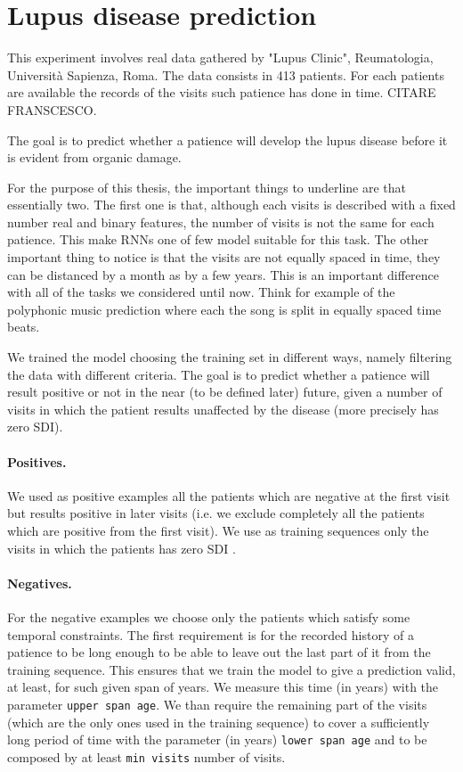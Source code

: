\section{Lupus disease prediction}

This experiment involves real data gathered by "Lupus Clinic", Reumatologia, Università Sapienza, Roma. The data consists in 413 patients. For each patients are available the records of the visits such patience has done in time. CITARE FRANSCESCO.

The goal is to predict whether a patience will develop the lupus disease before it is evident from organic damage.

For the purpose of this thesis, the important things to underline are that essentially two. The first one is that,  although each visits is described with a fixed number real and binary features, the number of visits  is not the same for each patience. This make RNNs one of few model suitable for this task. The other important thing to notice is that the visits are not equally spaced in time, they can be distanced by a month as by a few years. This is an important difference with all of the tasks we considered until now. Think for example of the polyphonic music prediction where each the song is split in equally spaced time beats.

 


We trained the model choosing the training set in different ways, namely filtering the data with different criteria. The goal is to predict whether a patience will result positive or not in the near (to be defined later) future, given a number of visits in which the patient results unaffected by the disease (more precisely has zero SDI).

\paragraph{Positives.} We used as positive examples all the patients which are negative at the first visit but results positive in later visits (i.e. we exclude completely all the patients which are positive from the first visit). We use as training sequences only the visits in which the patients has zero SDI .

\paragraph{Negatives.} For the negative examples we choose only the patients which satisfy some temporal constraints. The first requirement is for the recorded history of a patience to be long enough to be able to leave out the last part of it from the training sequence. This ensures that we train the model to give a prediction valid, at least, for such given span of years. We measure this time (in years) with the parameter \texttt{upper span age}.  We than require the remaining part of the visits (which are the only ones used in the training sequence) to cover a sufficiently long period of time with the parameter (in years) \texttt{lower span age} and to be composed by at least \texttt{min visits} number of visits.

